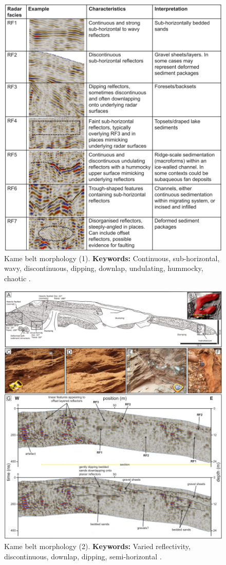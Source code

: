 \begin{figure}[h!]
    \centering
    \includegraphics[width=0.9\linewidth]{Figures/0.2GPR/Lovell_2019_1.png}
    \caption[Kame belt morphology (1).]{Kame belt morphology (1). \textbf{Keywords: } Continuous, sub-horizontal, wavy, discontinuous, dipping, downlap, undulating, hummocky, chaotic \citep{Lovell2019}.}
    \label{fig:Lovell2019-1}
\end{figure}
\clearpage
\begin{figure}[h!]
    \centering
    \includegraphics[width=0.9\linewidth]{Figures/0.2GPR/Lovell_2019_3.png}
    \caption[Kame belt morphology (2).]{Kame belt morphology (2). \textbf{Keywords: } Varied reflectivity, discontinuous, downlap, dipping, semi-horizontal \citep{Lovell2019}.}
    \label{fig:Lovell2019-3}
\end{figure}
\clearpage


